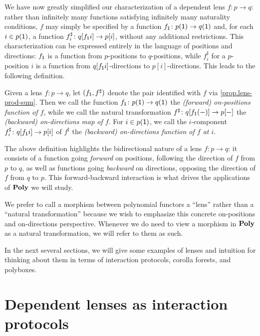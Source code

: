 \documentclass[Book-Poly]{subfiles}
\begin{document}
We have now greatly simplified our characterization of a dependent lens $f\colon p\to q$: rather than infinitely many functions satisfying infinitely many naturality conditions, $f$ may simply be specified by a function $f_{\textsf{1}}\colon p(\textsf{1})\to q(\textsf{1})$ and, for each $i\in p(\textsf{1})$, a function $f^\sharp_i\colon q[f_{\textsf{1}}i]\to p[i]$, without any additional restrictions.
This characterization can be expressed entirely in the language of positions and directions: $f_{\textsf{1}}$ is a function from $p$-positions to $q$-positions, while $f^\sharp_i$ for a $p$-position $i$ is a function from $q[f_{\textsf{1}}i]$-directions to $p[i]$-directions.
This leads to the following definition.

\begin{definition}
  Given a lens $f\colon p\to q$, let $(f_{\textsf{1}}, f^\sharp)$ denote the pair identified with $f$ via \cref{prop.lens-prod-sum}.
  Then we call the function $f_{\textsf{1}}\colon p(\textsf{1})\to q(\textsf{1})$ the \emph{(forward) on-positions function of $f$}, while we call the natural transformation $f^\sharp\colon q[f_{\textsf{1}}(-)]\to p[-]$ the \emph{(backward) on-directions map of $f$}.
  For $i\in p(\textsf{1})$, we call the $i$-component $f^\sharp_i\colon q[f_{\textsf{1}}i]\to p[i]$ of $f^\sharp$ the \emph{(backward) on-directions function of $f$ at $i$}.
\end{definition}

The above definition highlights the bidirectional nature of a lens $f\colon p\to q$: it consists of a function going \textit{forward} on positions, following the direction of $f$ from $p$ to $q$, as well as functions going \textit{backward} on directions, opposing the direction of $f$ from $q$ to $p$.
This forward-backward interaction is what drives the applications of $\mathbf{Poly}$ we will study.


We prefer to call a morphism between polynomial functors a ``lens'' rather than a ``natural transformation'' because we wish to emphasize this concrete on-positions and on-directions perspective.
Whenever we do need to view a morphism in $\mathbf{Poly}$ as a natural transformation, we will refer to them as such.

In the next several sections, we will give some examples of lenses and intuition for thinking about them in terms of interaction protocols, corolla forests, and polyboxes.


\section{Dependent lenses as interaction protocols}
\end{document}
